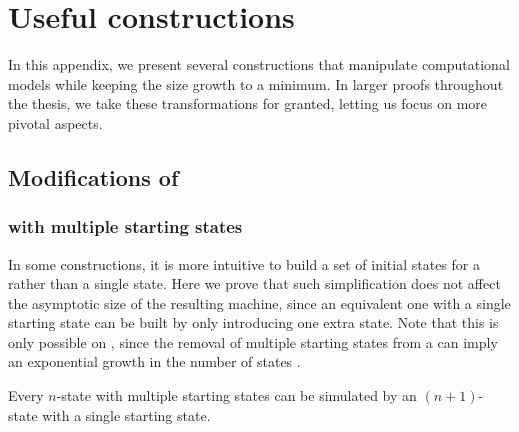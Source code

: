 \chapter{Useful constructions}
In this appendix, we present several constructions that manipulate computational models while keeping the size growth to a minimum.
In larger proofs throughout the thesis, we take these transformations for granted, letting us focus on more pivotal aspects.



\section{Modifications of \texorpdfstring{\ONFAs}{1NFAs}}


\subsection{\texorpdfstring{\ONFAs}{1NFAs} with multiple starting states}
In some constructions, it is more intuitive to build a set of initial states for a \ONFA rather than a single state.
Here we prove that such simplification does not affect the asymptotic size of the resulting machine, since an equivalent one with a single starting state can be built by only introducing one extra state.
Note that this is only possible on \ONFAs, since the removal of multiple starting states from a \ODFA can imply an exponential growth in the number of states \cite{HolSal+01}.
\begin{thrm}\label{thm:mult-start-states}
	Every $n$-state \ONFA with multiple starting states can be simulated by an $(n+1)$-state \ONFA with a single starting state.
\end{thrm}
